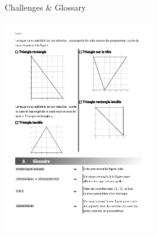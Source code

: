 \documentclass{beamer}
\begin{document}
\begin{frame}{Challenges \& Glossary}
\begin{center}
  \includegraphics[width=0.5\textwidth]{Triangle2.png}
\end{center}  
  
\end{frame}
\end{document}
